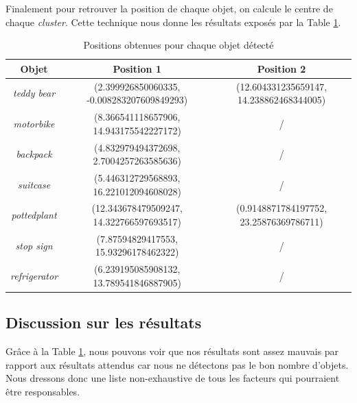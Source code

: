 \documentclass[10pt,a4paper]{article}
\begin{document}
   			Finalement pour retrouver la position de chaque objet, on calcule le centre de chaque \textit{cluster}. Cette technique nous donne les résultats exposés par la Table \ref{tab:res}.
   	
   		\begin{table}[h]
   			\begin{center}
   				\begin{tabular}{|c|c|c|}
   					\hline
   					Objet & Position 1 & Position 2\\
   					\hline
   					\textit{teddy bear} & (2.399926850060335, -0.008283207609849293)& (12.604331235659147, 14.238862468344005) \\
   					\hline
   					\textit{motorbike} & (8.366541118657906, 14.943175542227172) & / \\
   					\hline
   					\textit{backpack}& (4.832979494372698, 2.7004257263585636) & / \\
   					\hline
   					\textit{suitcase} & (5.446312729568893, 16.221012094608028) & / \\
   					\hline
   					\textit{pottedplant} & (12.343678479509247, 14.322766597693517) & (0.9148871784197752, 23.25876369786711) \\
   					\hline
   					\textit{stop sign} & (7.87594829417553, 15.93296178462322) & / \\
   					\hline
   					\textit{refrigerator} & (6.239195085908132, 13.789541846887905) & / \\
   					\hline
   				\end{tabular}
   			\end{center}
   			\caption{Positions obtenues pour chaque objet détecté}
   			\label{tab:res}
   		\end{table}
   	
   		\subsection{Discussion sur les résultats}
   		
   		Grâce à la Table \ref{tab:res}, nous pouvons voir que nos résultats sont assez mauvais par rapport aux résultats attendus car nous ne détectons pas le bon nombre d'objets. Nous dressons donc une liste non-exhaustive de tous les facteurs qui pourraient être responsables.
   		
   		

   		
   
          	
\end{document}
